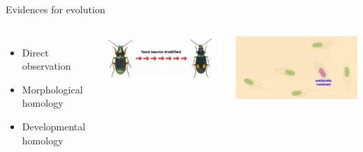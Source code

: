 \documentclass[11pt,dvipsnames,ignorenonframetext,aspectratio=169]{beamer}
\begin{document}
\begin{frame}{Evidences for evolution}
\protect\hypertarget{evidences-for-evolution}{}
\begin{columns}[T,onlytextwidth]


\begin{itemize}
\item Direct observation
\item Morphological homology
\item Developmental homology
\end{itemize}



\includegraphics[width=0.9\linewidth]{../images/insect_fooding_changes_evolution} 


\includegraphics[width=0.85\linewidth]{../images/bacterial_antibiotic_resistance} 

\end{columns}
\end{frame}
\end{document}
